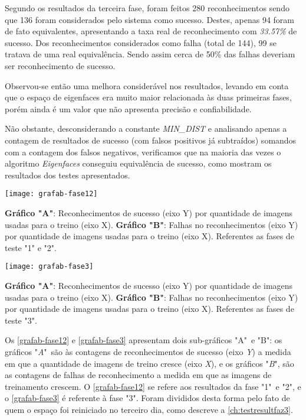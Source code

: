Segundo os resultados da terceira fase, foram feitos 280 reconhecimentos sendo que 136 foram considerados pelo sistema como sucesso. Destes, apenas 94 foram de fato equivalentes, apresentando a taxa real de reconhecimento com \textit{33.57\%} de sucesso. Dos reconhecimentos considerados como falha (total de 144), 99 se tratava de uma real equivalência. Sendo assim cerca de 50\% das falhas deveriam ser reconhecimento de sucesso.

Observou-se então uma melhora considerável nos resultados, levando em conta que o espaço de eigenfaces era muito maior relacionada às duas primeiras fases, porém ainda é um valor que não apresenta precisão e confiabilidade. 

Não obstante, desconsiderando a constante \textit{MIN\_DIST} e analisando apenas a contagem de resultados de sucesso (com falsos positivos já subtraídos) somandos com a contagem dos falsos negativos, verificamos que na maioria das vezes o algoritmo \textit{Eigenfaces} conseguiu equivalência de sucesso, como mostram os resultados dos testes apresentados.


\begin{grafico}[h]
	\centering
	\texttt{[image: grafab-fase12]}
	\caption{\textbf{Gráfico "A"}: Reconhecimentos de sucesso (eixo Y) por quantidade de imagens usadas para o treino (eixo X). \textbf{Gráfico "B"}: Falhas no reconhecimentos (eixo Y) por quantidade de imagens usadas para o treino (eixo X). Referentes as fases de teste "1" e "2".}
	\label{grafab-fase12}
\end{grafico}

\begin{grafico}[h]
	\centering
	\texttt{[image: grafab-fase3]}
	\caption{\textbf{Gráfico "A"}: Reconhecimentos de sucesso (eixo Y) por quantidade de imagens usadas para o treino (eixo X). \textbf{Gráfico "B"}: Falhas no reconhecimentos (eixo Y) por quantidade de imagens usadas para o treino (eixo X). Referentes as fases de teste "3".}
	\label{grafab-fase3}
\end{grafico}


Os \autoref{grafab-fase12} e \autoref{grafab-fase3} apresentam dois sub-gráficos "A"\ e "B": os gráficos "\textit{A}"\ são às contagens de reconhecimentos de sucesso (eixo \textit{Y}) a medida em que a quantidade de imagens de treino cresce (eixo \textit{X}), e os gráficos "\textit{B}", são as contagens de falhas de reconhecimento a medida em que as imagens de treinamento crescem. O \autoref{grafab-fase12} se refere aos resultados da fase "1"\ e "2", e o \autoref{grafab-fase3} é referente à fase "3". Foram divididos desta forma pelo fato de quem o espaço foi reiniciado no terceiro dia, como descreve a \autoref{ch:testresultfaz3}. 

